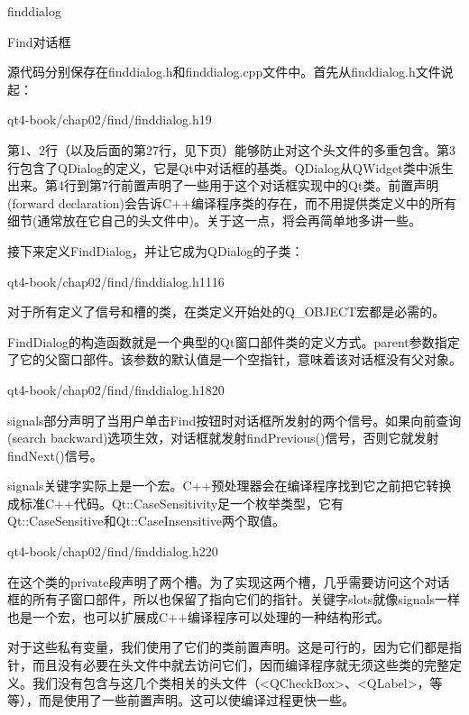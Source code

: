 \documentclass[11pt,oneside]{book}
\begin{document}
\begin{common-format}
\begin{fig}{finddialog}
\caption{Find对话框}
\label{fig:finddialog}
\end{fig}

源代码分别保存在finddialog.h和finddialog.cpp文件中。首先从finddialog.h文件说起：
\begin{cppline}{qt4-book/chap02/find/finddialog.h}{1}{9}
\end{cppline}


第1、2行（以及后面的第27行，见下页）能够防止对这个头文件的多重包含。第3行包含了QDialog的定义，它是Qt中对话框的基类。QDialog从QWidget类中派生出来。第4行到第7行前置声明了一些用于这个对话框实现中的Qt类。前置声明(forward declaration)会告诉C++编译程序类的存在，而不用提供类定义中的所有细节(通常放在它自己的头文件中)。关于这一点，将会再简单地多讲一些。

接下来定义FindDialog，并让它成为QDialog的子类：
\begin{cppline}[8]{qt4-book/chap02/find/finddialog.h}{11}{16}
\end{cppline}


对于所有定义了信号和槽的类，在类定义开始处的Q\_{}OBJECT宏都是必需的。

FindDialog的构造函数就是一个典型的Qt窗口部件类的定义方式。parent参数指定了它的父窗口部件。该参数的默认值是一个空指针，意味着该对话框没有父对象。
\begin{cppline}[13]{qt4-book/chap02/find/finddialog.h}{18}{20}
\end{cppline}

signals部分声明了当用户单击Find按钮时对话框所发射的两个信号。如果向前查询(search backward)选项生效，对话框就发射findPrevious()信号，否则它就发射findNext()信号。

signals关键字实际上是一个宏。C++预处理器会在编译程序找到它之前把它转换成标准C++代码。Qt::CaseSensitivity足一个枚举类型，它有\\ Qt::CaseSensitive和Qt::CaseInsensitive两个取值。
\begin{cppline}[16]{qt4-book/chap02/find/finddialog.h}{22}{0}
\end{cppline}

在这个类的private段声明了两个槽。为了实现这两个槽，几乎需要访问这个对话框的所有子窗口部件，所以也保留了指向它们的指针。关键字slots就像signals一样也是一个宏，也可以扩展成C++编译程序可以处理的一种结构形式。

对于这些私有变量，我们使用了它们的类前置声明。这是可行的，因为它们都是指针，而且没有必要在头文件中就去访问它们，因而编译程序就无须这些类的完整定义。我们没有包含与这几个类相关的头文件（<QCheckBox>、<QLabel>，等等），而是使用了一些前置声明。这可以使编译过程更快一些。


\end{common-format}
\end{document}
